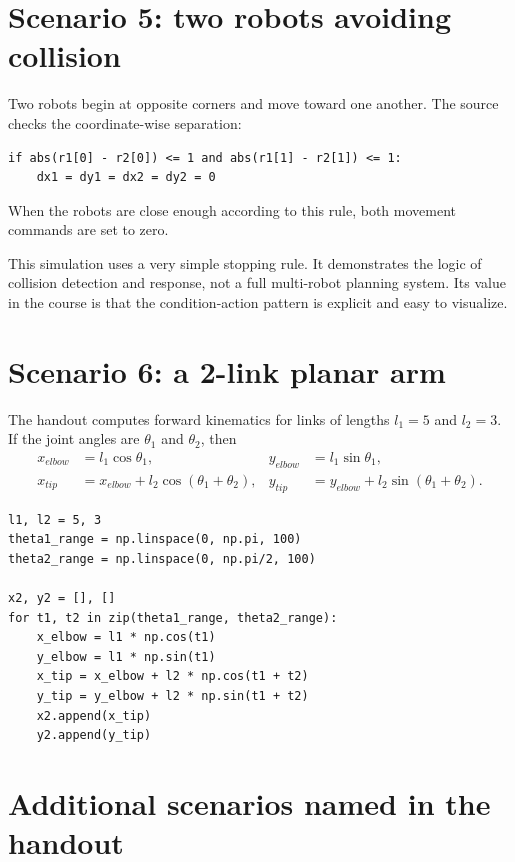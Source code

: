 \section{Scenario 5: two robots avoiding collision}

Two robots begin at opposite corners and move toward one another. The source checks the coordinate-wise separation:

\begin{lstlisting}[style=mlpython]
if abs(r1[0] - r2[0]) <= 1 and abs(r1[1] - r2[1]) <= 1:
    dx1 = dy1 = dx2 = dy2 = 0
\end{lstlisting}

When the robots are close enough according to this rule, both movement commands are set to zero.

\begin{pitfall}
This simulation uses a very simple stopping rule. It demonstrates the logic of collision detection and response, not a full multi-robot planning system. Its value in the course is that the condition-action pattern is explicit and easy to visualize.
\end{pitfall}

\section{Scenario 6: a 2-link planar arm}

The handout computes forward kinematics for links of lengths \(l_1=5\) and \(l_2=3\). If the joint angles are \(\theta_1\) and \(\theta_2\), then
\begin{align*}
x_{elbow}&=l_1\cos\theta_1,
&y_{elbow}&=l_1\sin\theta_1,\\
x_{tip}&=x_{elbow}+l_2\cos(\theta_1+\theta_2),
&y_{tip}&=y_{elbow}+l_2\sin(\theta_1+\theta_2).
\end{align*}

\begin{lstlisting}[style=mlpython]
l1, l2 = 5, 3
theta1_range = np.linspace(0, np.pi, 100)
theta2_range = np.linspace(0, np.pi/2, 100)

x2, y2 = [], []
for t1, t2 in zip(theta1_range, theta2_range):
    x_elbow = l1 * np.cos(t1)
    y_elbow = l1 * np.sin(t1)
    x_tip = x_elbow + l2 * np.cos(t1 + t2)
    y_tip = y_elbow + l2 * np.sin(t1 + t2)
    x2.append(x_tip)
    y2.append(y_tip)
\end{lstlisting}

\section{Additional scenarios named in the handout}

